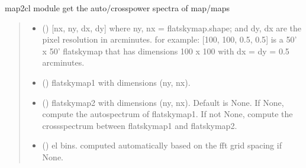 \documentclass[letterpaper,10pt,english]{sphinxmanual}
\begin{document}

\begin{fulllineitems}
\label{\detokenize{flatsky:flatsky.map2cl}}
\pysigstartsignatures
{}
\pysigstopsignatures
\sphinxAtStartPar
map2cl module \sphinxhyphen{} get the auto\sphinxhyphen{}/cross\sphinxhyphen{}power spectra of map/maps
\begin{quote}\begin{description}
\begin{itemize}
\item {} 
\sphinxAtStartPar
{} () \textendash{} {[}nx, ny, dx, dy{]} where ny, nx = flatskymap.shape; and dy, dx are the pixel resolution in arcminutes.
for example: {[}100, 100, 0.5, 0.5{]} is a 50’ x 50’ flatskymap that has dimensions 100 x 100 with dx = dy = 0.5 arcminutes.

\item {} 
\sphinxAtStartPar
{} () \textendash{} flatskymap1 with dimensions (ny, nx).

\item {} 
\sphinxAtStartPar
{} (\sphinxstyleliteralemphasis{\sphinxupquote{ (}}\sphinxstyleliteralemphasis{\sphinxupquote{)}}) \textendash{} flatskymap2 with dimensions (ny, nx).
Default is None.
If None, compute the auto\sphinxhyphen{}spectrum of flatskymap1.
If not None, compute the cross\sphinxhyphen{}spectrum between flatskymap1 and flatskymap2.

\item {} 
\sphinxAtStartPar
{} () \textendash{} el bins. computed automatically based on the fft grid spacing if None.


\end{itemize}
\end{description}
\end{quote}
\end{fulllineitems}
\end{document}
